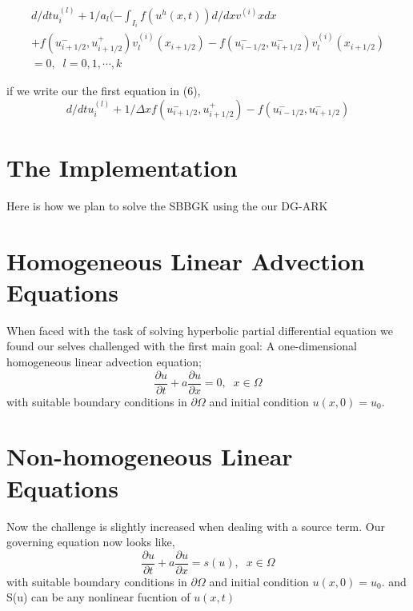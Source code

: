\begin{eqnarray}
 d/dt u_i^{(l)} + 1/a_l(-\int_{I_i} f(u^h(x,t))d/dx v^{(i)}x dx \\ \nonumber
 	+ f(u_{i+1/2}^{-},u_{i+1/2}^{+})v_l^{(i)}(x_{i+1/2}) 
 	- f(u_{i-1/2}^{-},u_{i+1/2}^{-})v_l^{(i)}(x_{i+1/2}) \\ \nonumber
	= 0, \; \;  l = 0,1, \cdots ,k
\end{eqnarray}

if we write our the first equation in (6),
\begin{equation}
 d/dt u_i^{(l)} + 1/{\Delta x}f(u_{i+1/2}^{-},u_{i+1/2}^{+})
 	- f(u_{i-1/2}^{-},u_{i+1/2}^{-})
\end{equation}

\section{The Implementation}
Here is how we plan to solve the SBBGK using the our DG-ARK

\section{Homogeneous Linear Advection Equations}
When faced with the task of solving hyperbolic partial differential equation we found our selves challenged with the first main goal: A one-dimensional homogeneous linear advection equation;
\begin{equation}
	\frac{\partial u}{\partial t} + a \frac{\partial u}{\partial x} = 0, \;\; x \in \Omega
	\label{homo_advection}
\end{equation}
with suitable boundary conditions in $\partial \Omega$ and initial condition $u(x,0) = u_0$.


\section{Non-homogeneous Linear Equations}
Now the challenge is slightly increased when dealing with a source term. Our governing equation now looks like,
\begin{equation}
	\frac{\partial u}{\partial t} + a \frac{\partial u}{\partial x} = s(u), \;\; x \in \Omega
	\label{nonhomo_advection}
\end{equation}
with suitable boundary conditions in $\partial \Omega$ and initial condition $u(x,0) = u_0$.
and S(u) can be any nonlinear fucntion of $u(x,t)$

